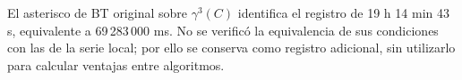 \begin{table}[htbp]
\centering

\caption{Resultados manuales de YYC y BT sobre $\gamma^N(C)$,
en orden original y ascendente. Todos los tiempos están en ms.}
\label{tab:resultadosgamma52}
\end{table}

El asterisco de BT original sobre $\gamma^3(C)$ identifica el
registro de 19 h 14 min 43 s, equivalente a 69\,283\,000 ms.
No se verificó la equivalencia de sus condiciones con las de
la serie local; por ello se conserva como registro adicional,
sin utilizarlo para calcular ventajas entre algoritmos.

